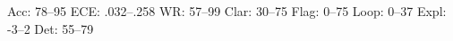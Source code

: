 Acc: 78--95
ECE: .032--.258
WR: 57--99
Clar: 30--75
Flag: 0--75
Loop: 0--37
Expl: -3--2
Det: 55--79
